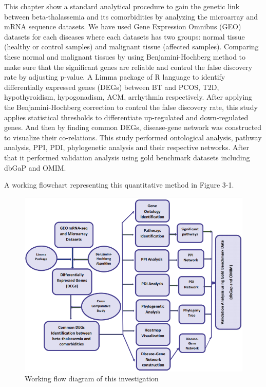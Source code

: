 This chapter show a standard analytical procedure to gain the genetic link between beta-thalassemia and its comorbidities by analyzing the microarray and mRNA sequence datasets. We have used Gene Expression Omnibus (GEO) datasets for each diseases where each datasets has two groups: normal tissue (healthy or control samples) and malignant tissue (affected samples). Comparing these normal and malignant tissues by using Benjamini-Hochberg method to make sure that the significant genes are reliable and control the false discovery rate by adjusting p-value. A Limma package of R language to identify differentially expressed genes (DEGs) between BT and PCOS, T2D, hypothyroidism, hypogonadism, ACM, arrhythmia respectively. After applying the Benjamini-Hochberg correction to control the false discovery rate, this study applies statistical thresholds to differentiate up-regulated and down-regulated genes. And then by finding common DEGs, disease-gene network was constructed to visualize their co-relations. This study performed ontological analysis, pathway analysis, PPI, PDI, phylogenetic analysis and their respective networks. After that it performed validation analysis using gold benchmark datasets including dbGaP and OMIM. 

A working flowchart representing this quantitative method in Figure 3-1.

\begin{figure}[H]
    \centering
    \includegraphics[width=14cm]{./fig/p1.PNG}
    \caption{Working flow diagram of this investigation}
    \label{fig:dataset_mass_images}
\end{figure}

